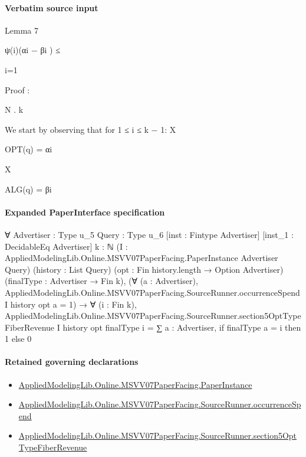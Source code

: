 \documentclass[10pt]{article}
\begin{document}
\paragraph{Verbatim source input}
\begin{ReviewVerbatim}
Lemma 7

ψ(i)(αi − βi ) ≤

i=1

Proof :

N
.
k

We start by observing that for 1 ≤ i ≤ k − 1:
X

OPT(q) = αi

X

ALG(q) = βi
\end{ReviewVerbatim}



\paragraph{Expanded PaperInterface specification}
\begin{ReviewVerbatim}
∀ {Advertiser : Type u_5} {Query : Type u_6} [inst : Fintype Advertiser] [inst_1 : DecidableEq Advertiser] {k : ℕ}
  (I : AppliedModelingLib.Online.MSVV07PaperFacing.PaperInstance Advertiser Query) (history : List Query)
  (opt : Fin history.length → Option Advertiser) (finalType : Advertiser → Fin k),
  (∀ (a : Advertiser), AppliedModelingLib.Online.MSVV07PaperFacing.SourceRunner.occurrenceSpend I history opt a = 1) →
    ∀ (i : Fin k),
      AppliedModelingLib.Online.MSVV07PaperFacing.SourceRunner.section5OptTypeFiberRevenue I history opt finalType i =
        ∑ a : Advertiser, if finalType a = i then 1 else 0
\end{ReviewVerbatim}

\paragraph{Retained governing declarations}
\begin{itemize}\raggedright
\item \hyperlink{governing-declaration-11907576ec71eeb5}{Applied\allowbreak{}Modeling\allowbreak{}Lib.\allowbreak{}Online.\allowbreak{}MSVV07\allowbreak{}Paper\allowbreak{}Facing.\allowbreak{}Paper\allowbreak{}Instance}
\item \hyperlink{governing-declaration-7fc0f371ea84f275}{Applied\allowbreak{}Modeling\allowbreak{}Lib.\allowbreak{}Online.\allowbreak{}MSVV07\allowbreak{}Paper\allowbreak{}Facing.\allowbreak{}Source\allowbreak{}Runner.\allowbreak{}occurrence\allowbreak{}Spend}
\item \hyperlink{governing-declaration-4eb2f05b70311c56}{Applied\allowbreak{}Modeling\allowbreak{}Lib.\allowbreak{}Online.\allowbreak{}MSVV07\allowbreak{}Paper\allowbreak{}Facing.\allowbreak{}Source\allowbreak{}Runner.\allowbreak{}section5\allowbreak{}Opt\allowbreak{}Type\allowbreak{}Fiber\allowbreak{}Revenue}
\end{itemize}
\end{document}
